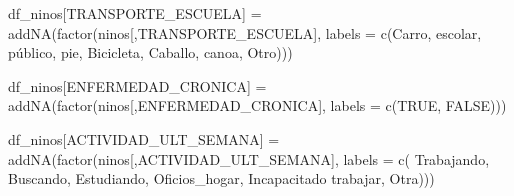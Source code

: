 \documentclass[
]{article}
\newenvironment{Shaded}{\begin{snugshade}}{\end{snugshade}}
\newcommand{\AttributeTok}[1]{\textcolor[rgb]{0.77,0.63,0.00}{#1}}
\newcommand{\ConstantTok}[1]{\textcolor[rgb]{0.00,0.00,0.00}{#1}}
\newcommand{\FunctionTok}[1]{\textcolor[rgb]{0.00,0.00,0.00}{#1}}
\newcommand{\NormalTok}[1]{#1}
\newcommand{\OtherTok}[1]{\textcolor[rgb]{0.56,0.35,0.01}{#1}}
\newcommand{\StringTok}[1]{\textcolor[rgb]{0.31,0.60,0.02}{#1}}
\begin{document}
\begin{Shaded}
\begin{Highlighting}[]
\NormalTok{df\_ninos[}\StringTok{\textquotesingle{}TRANSPORTE\_ESCUELA\textquotesingle{}}\NormalTok{] }\OtherTok{=} \FunctionTok{addNA}\NormalTok{(}\FunctionTok{factor}\NormalTok{(ninos[,}\StringTok{\textquotesingle{}TRANSPORTE\_ESCUELA\textquotesingle{}}\NormalTok{], }
                                        \AttributeTok{labels =} \FunctionTok{c}\NormalTok{(}\StringTok{\textquotesingle{}Carro\textquotesingle{}}\NormalTok{, }\StringTok{\textquotesingle{}escolar\textquotesingle{}}\NormalTok{, }\StringTok{\textquotesingle{}público\textquotesingle{}}\NormalTok{,}
                                                   \StringTok{\textquotesingle{}pie\textquotesingle{}}\NormalTok{, }\StringTok{\textquotesingle{}Bicicleta\textquotesingle{}}\NormalTok{, }\StringTok{\textquotesingle{}Caballo\textquotesingle{}}\NormalTok{,}
                                                   \StringTok{\textquotesingle{}canoa\textquotesingle{}}\NormalTok{, }\StringTok{\textquotesingle{}Otro\textquotesingle{}}\NormalTok{)))}

\NormalTok{df\_ninos[}\StringTok{\textquotesingle{}ENFERMEDAD\_CRONICA\textquotesingle{}}\NormalTok{] }\OtherTok{=}  \FunctionTok{addNA}\NormalTok{(}\FunctionTok{factor}\NormalTok{(ninos[,}\StringTok{\textquotesingle{}ENFERMEDAD\_CRONICA\textquotesingle{}}\NormalTok{], }
                                               \AttributeTok{labels =} \FunctionTok{c}\NormalTok{(}\ConstantTok{TRUE}\NormalTok{, }\ConstantTok{FALSE}\NormalTok{)))}

\NormalTok{df\_ninos[}\StringTok{\textquotesingle{}ACTIVIDAD\_ULT\_SEMANA\textquotesingle{}}\NormalTok{] }\OtherTok{=} \FunctionTok{addNA}\NormalTok{(}\FunctionTok{factor}\NormalTok{(ninos[,}\StringTok{\textquotesingle{}ACTIVIDAD\_ULT\_SEMANA\textquotesingle{}}\NormalTok{], }
                                          \AttributeTok{labels =} \FunctionTok{c}\NormalTok{( }\StringTok{\textquotesingle{}Trabajando\textquotesingle{}}\NormalTok{, }\StringTok{\textquotesingle{}Buscando\textquotesingle{}}\NormalTok{,}
                                                      \StringTok{\textquotesingle{}Estudiando\textquotesingle{}}\NormalTok{, }\StringTok{\textquotesingle{}Oficios\_hogar\textquotesingle{}}\NormalTok{, }
                                                      \StringTok{\textquotesingle{}Incapacitado trabajar\textquotesingle{}}\NormalTok{, }\StringTok{\textquotesingle{}Otra\textquotesingle{}}\NormalTok{)))}


\end{Highlighting}
\end{Shaded}
\end{document}

